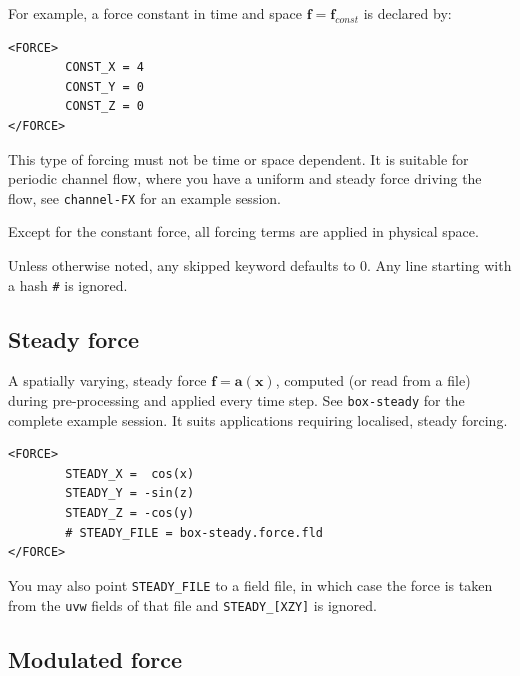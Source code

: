 \documentclass[11pt]{report}
\begin{document}
\noindent For example, a force constant in time and space $\bm{f} =
\bm{f}_{const}$ is declared by:
\begin{verbatim}
<FORCE>
        CONST_X = 4
        CONST_Y = 0
        CONST_Z = 0
</FORCE>
\end{verbatim}
This type of forcing must not be time or space dependent. It is suitable
for periodic channel flow, where you have a uniform and steady force
driving the flow, see \verb+channel-FX+ for an example session.

Except for the constant force, all forcing terms are applied in
physical space.

Unless otherwise noted, any skipped keyword defaults to 0. Any line
starting with a hash \verb+#+ is ignored.

\subsection{Steady force}

A spatially varying, steady force $\bm{f} = \bm{a}(\bm{x})$, computed
(or read from a file) during pre-processing and applied every time
step. See \verb|box-steady| for the complete example session. It suits
applications requiring localised, steady forcing.
\begin{verbatim}
<FORCE>
        STEADY_X =  cos(x)
        STEADY_Y = -sin(z)
        STEADY_Z = -cos(y)
        # STEADY_FILE = box-steady.force.fld
</FORCE>
\end{verbatim}

You may also point \verb+STEADY_FILE+ to a field file, in which case
the force is taken from the \verb+uvw+ fields of that file and
\verb+STEADY_[XZY]+ is ignored.

\subsection{Modulated force}
\end{document}
